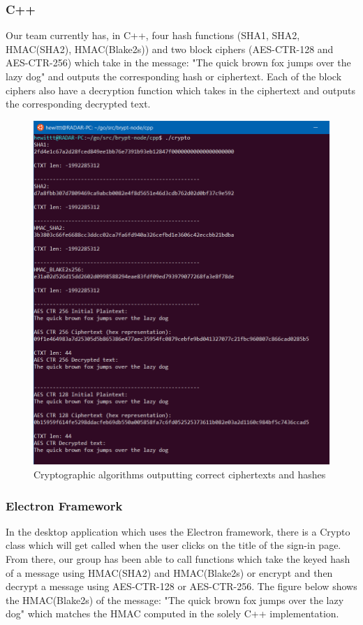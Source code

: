 \documentclass[tikz,a4paper,titlepage]{article}
\begin{document}
\subsubsection{C++}

Our team currently has, in C++, four hash functions (SHA1, SHA2, HMAC(SHA2), HMAC(Blake2s)) and two block ciphers (AES-CTR-128 and AES-CTR-256) which take in the message: "The quick brown fox jumps over the lazy dog" and outputs the corresponding hash or ciphertext. Each of the block ciphers also have a decryption function which takes in the ciphertext and outputs the corresponding decrypted text. 

\begin{figure}[H]
  \centering
    \includegraphics[scale=.9]{cpp-enc.PNG}
    \caption{Cryptographic algorithms outputting correct ciphertexts and hashes}
\end{figure}

\subsubsection{Electron Framework}

In the desktop application which uses the Electron framework, there is a Crypto class which will get called when the user clicks on the title of the sign-in page. From there, our group has been able to call functions which take the keyed hash of a message using HMAC(SHA2) and HMAC(Blake2s) or encrypt and then decrypt a message using AES-CTR-128 or AES-CTR-256. The figure below shows the HMAC(Blake2s) of the message: "The quick brown fox jumps over the lazy dog" which matches the HMAC computed in the solely C++ implementation.
\end{document}
